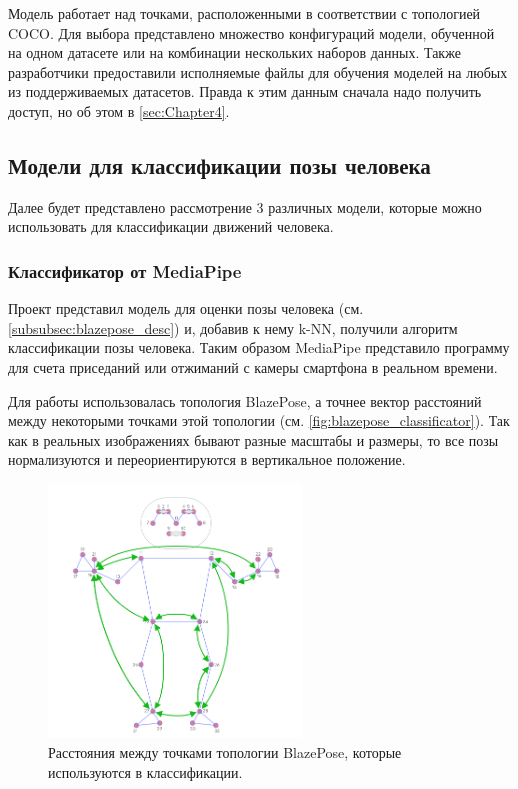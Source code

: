 Модель работает над точками, расположенными в соответствии с топологией COCO. Для выбора представлено множество конфигураций модели, обученной на одном датасете или на комбинации нескольких наборов данных. Также разработчики предоставили исполняемые файлы для обучения моделей на любых из поддерживаемых датасетов. Правда к этим данным сначала надо получить доступ, но об этом в \autoref{sec:Chapter4}.


\hfill \break








\subsection{Модели для классификации позы человека}
\label{subsec:pose_classification_models}

Далее будет представлено рассмотрение 3 различных модели, которые можно использовать для классификации движений человека.



\subsubsection{Классификатор от MediaPipe}
\label{subsubsec:mp_classificator_desc}

Проект представил модель для оценки позы человека (см. \autoref{subsubsec:blazepose_desc}) и, добавив к нему k-NN, получили алгоритм классификации позы человека. Таким образом MediaPipe представило программу для счета приседаний или отжиманий с камеры смартфона в реальном времени. \cite{mediapipe_cls}

Для работы использовалась топология BlazePose, а точнее вектор расстояний между некоторыми точками этой топологии (см. \autoref{fig:blazepose_classificator}). Так как в реальных изображениях бывают разные масштабы и размеры, то все позы нормализуются и переориентируются в вертикальное положение.

\begin{figure}[h]
	\centering
	\includegraphics[width=0.6\textwidth]{./images/Classificators/BlazePose}
	\caption{Расстояния между точками топологии BlazePose, которые используются в классификации. \cite{mediapipe_cls}}
	\label{fig:blazepose_classificator}
\end{figure}

